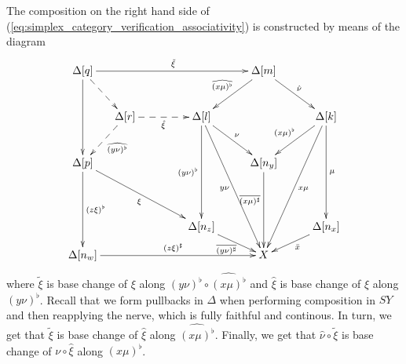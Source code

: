 The composition on the right hand side of (\ref{eq:simplex_category_verification_associativity}) is constructed by means of the diagram
\begin{displaymath}
\xymatrix@=1em{
\Delta [q] \ar[dddd] \ar@{-->}[ddr] \ar[rrrrrr]^{\tilde{\xi }} &&&&&& \Delta [m] \ar[lldd]_{\widehat{(x\mu )^\flat }} \ar[ddrr]^{\hat{\nu } } \\
\\
& \Delta [r] \ar@{-->}[ldd]^{\widehat{(y\nu )^\flat } } \ar@{-->}[rrr]_{\hat{\xi } } &&& \Delta [l] \ar[ddrr]^\nu \ar[ddddd]_{(y\nu )^\flat } \ar[ddddddrr]_{y\nu } &&&& \Delta [k] \ar[lldd]_{(x\mu )^\flat } \ar[ddddd]^\mu \ar[lldddddd]^{x\mu } \\
\\
\Delta [p] \ar[dddd]^{(z\xi )^\flat } \ar[dddrrrr]_{\xi} &&&&&& \Delta [n_y] \ar[dddd]_(.4){\overline{(x\mu )^\sharp } } \\
&&&&&&&& \\
\\
&&&& \Delta [n_z] \ar[drr]_{\overline{(y\nu )^\sharp } } &&&& \Delta [n_x] \ar[lld]^{\bar{x} } \\
\Delta [n_w] \ar[rrrrrr]^{(z\xi )^\sharp } &&&&&& X
}
\end{displaymath}
where $\tilde{\xi }$ is base change of $\xi$ along $(y\nu )^\flat \circ \widehat{(x\mu )^\flat }$ and $\hat{\xi }$ is base change of $\xi$ along $(y\nu )^\flat$. Recall that we form pullbacks in $\Delta$ when performing composition in $SY$ and then reapplying the nerve, which is fully faithful and continous. In turn, we get that $\tilde{\xi }$ is base change of $\hat{\xi }$ along $\widehat{(x\mu )^\flat }$. Finally, we get that $\hat{\nu }\circ \tilde{\xi }$ is base change of $\nu \circ \hat{\xi }$ along $(x\mu )^\flat$.

